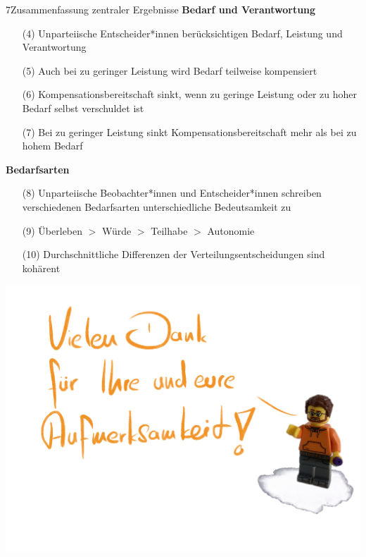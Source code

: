 \documentclass[xcolor=table,9pt,aspectratio=169]{beamer}
\begin{document}
\begin{frame}{\vspace*{10mm}7\hspace*{1em}Zusammenfassung zentraler Ergebnisse}
\textbf{Bedarf und Verantwortung}\\
\medskip
\begin{itemize}
   \item[(4)] Unparteiische Entscheider*innen berücksichtigen Bedarf, Leistung und Verantwortung
   \item[(5)] Auch bei zu geringer Leistung wird Bedarf teilweise kompensiert
   \item[(6)] Kompensationsbereitschaft sinkt, wenn zu geringe Leistung oder zu hoher Bedarf selbst verschuldet ist
   \item[(7)] Bei zu geringer Leistung sinkt Kompensationsbereitschaft mehr als bei zu hohem Bedarf
\end{itemize}
\vspace{2em}
\textbf{Bedarfsarten}\\
\medskip
\begin{itemize}
   \item[(8)] Unparteiische Beobachter*innen und Entscheider*innen schreiben verschiedenen Bedarfsarten unterschiedliche Bedeutsamkeit zu
   \item[(9)] Überleben $>$ Würde $>$ Teilhabe $>$ Autonomie
   \item[(10)] Durchschnittliche Differenzen der Verteilungsentscheidungen sind kohärent
   \end{itemize}
\end{frame}


\begin{frame}{}
\begin{center}
   \includegraphics[width=0.8\linewidth]{figures/slides_thanks.pdf}
\end{center}
\end{frame}
\end{document}
